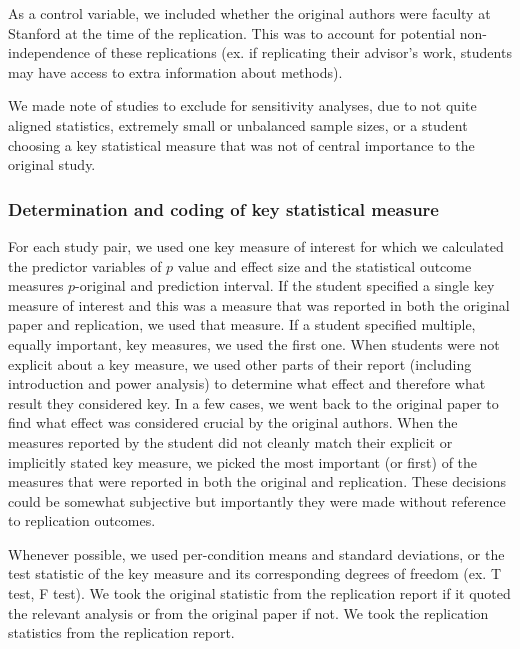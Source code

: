 \documentclass[
  english,
  a4paper,
]{article}
\begin{document}
As a control variable, we included whether the original authors were faculty at Stanford at the time of the replication. This was to account for potential non-independence of these replications (ex. if replicating their advisor's work, students may have access to extra information about methods).

We made note of studies to exclude for sensitivity analyses, due to not quite aligned statistics, extremely small or unbalanced sample sizes, or a student choosing a key statistical measure that was not of central importance to the original study.

\hypertarget{determination-and-coding-of-key-statistical-measure}{%
\subsubsection{Determination and coding of key statistical measure}\label{determination-and-coding-of-key-statistical-measure}}

For each study pair, we used one key measure of interest for which we calculated the predictor variables of \(p\) value and effect size and the statistical outcome measures \(p\)-original and prediction interval. If the student specified a single key measure of interest and this was a measure that was reported in both the original paper and replication, we used that measure. If a student specified multiple, equally important, key measures, we used the first one. When students were not explicit about a key measure, we used other parts of their report (including introduction and power analysis) to determine what effect and therefore what result they considered key. In a few cases, we went back to the original paper to find what effect was considered crucial by the original authors. When the measures reported by the student did not cleanly match their explicit or implicitly stated key measure, we picked the most important (or first) of the measures that were reported in both the original and replication. These decisions could be somewhat subjective but importantly they were made without reference to replication outcomes.

Whenever possible, we used per-condition means and standard deviations, or the test statistic of the key measure and its corresponding degrees of freedom (ex. T test, F test). We took the original statistic from the replication report if it quoted the relevant analysis or from the original paper if not. We took the replication statistics from the replication report.
\end{document}
